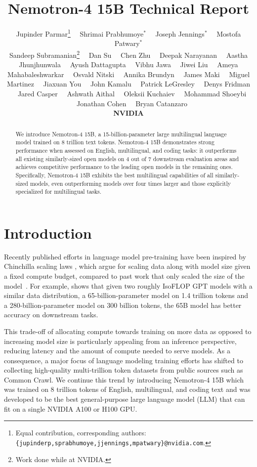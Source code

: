 \documentclass[11pt]{article}
\title{Nemotron-4 15B Technical Report}
\author{Jupinder Parmar\footnote{
Equal contribution, corresponding authors: {\tt 
\{jupinderp,sprabhumoye,jjennings,mpatwary\}@nvidia.com}. 
} \ \ Shrimai Prabhumoye$^{*}$ \ \ Joseph Jennings$^{*}$ \ \ Mostofa Patwary$^{*}$ \\ Sandeep Subramanian\footnote{Work done while at NVIDIA.} \ \ Dan Su \ \ Chen Zhu \ \ Deepak Narayanan \ \  Aastha Jhunjhunwala \ \  Ayush Dattagupta \ \ Vibhu Jawa \ \ Jiwei Liu \ \ Ameya Mahabaleshwarkar \ \ Osvald Nitski \ \  Annika Brundyn \ \ James Maki \ \ Miguel Martinez \ \ Jiaxuan You \ \ John Kamalu \ \ Patrick LeGresley \ \ Denys Fridman \ \ Jared Casper \ \  Ashwath Aithal \ \ Oleksii Kuchaiev \ \ Mohammad Shoeybi \ \ Jonathan Cohen \ \ Bryan Catanzaro \par \textbf{NVIDIA}}
\date{}
\newcommand{\ours}{Nemotron-4}
\begin{document}
\parindent 0.0in
\parskip 0.15in

\maketitle

\begin{abstract}
We introduce \ours{} 15B, a 15-billion-parameter large multilingual language model trained on 8 trillion text tokens. \ours{} 15B demonstrates strong performance when assessed on English, multilingual, and coding tasks: it outperforms all existing similarly-sized open models on 4 out of 7 downstream evaluation areas and achieves competitive performance to the leading open models in the remaining ones. Specifically, \ours{} 15B exhibits the best multilingual capabilities of all similarly-sized models, even outperforming models over four times larger and those explicitly specialized for multilingual tasks.

\end{abstract}

\section{Introduction}

Recently published efforts \citep{hoffmann2022training,touvron2023llama,touvron2023llama2,yang2023baichuan, jiang2023mistral} in language model pre-training have been inspired by Chinchilla scaling laws \citep{hoffmann2022training}, which argue for scaling data along with model size given a fixed compute budget, compared to past work that only scaled the size of the model~\citep{kaplan2020scaling,brown2020language, smith2022,rae2022scaling,workshop2023bloom}.
For example, \citep{hoffmann2022training} shows that given two roughly IsoFLOP GPT models with a similar data distribution, a 65-billion-parameter model on 1.4 trillion tokens and a 280-billion-parameter model on 300 billion tokens, the 65B model has better accuracy on downstream tasks. 

This trade-off of allocating compute towards training on more data as opposed to increasing model size is particularly appealing from an inference perspective, reducing latency and the amount of compute needed to serve models. As a consequence, a major focus of language modeling training efforts has shifted to collecting high-quality multi-trillion token datasets from public sources such as Common Crawl. We continue this trend by introducing \ours{} 15B which was trained on 8 trillion tokens of English, multilingual, and coding text and was developed to be the best general-purpose large language model (LLM) that can fit on a single NVIDIA A100 or H100 GPU.
\end{document}
